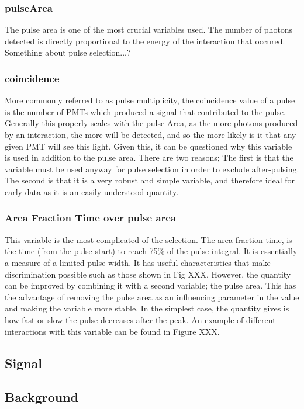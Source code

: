 \subsubsection{pulseArea}
The pulse area is one of the most crucial variables used.
The number of photons detected is directly proportional to the energy of the interaction that occured.
Something about pulse selection...?

\subsubsection{coincidence}
More commonly referred to as pulse multiplicity, the coincidence value of a pulse is the number of PMTs which produced a signal that contributed to the pulse.
Generally this properly scales with the pulse Area, as the more photons produced by an interaction, the more will be detected, and so the more likely is it that any given PMT will see this light.
Given this, it can be questioned why this variable is used in addition to the pulse area. 
There are two reasons;
The first is that the variable must be used anyway for pulse selection in order to exclude after-pulsing.
The second is that it is a very robust and simple variable, and therefore ideal for early data as it is an easily understood quantity.

\subsubsection{Area Fraction Time over pulse area}
This variable is the most complicated of the selection.
The area fraction time, is the time (from the pulse start) to reach 75\% of the pulse integral.
It is essentially a measure of a limited pulse-width.
It has useful characteristics that make discrimination possible such as those shown in Fig XXX.
However, the quantity can be improved by combining it with a second variable; the pulse area.
This has the advantage of removing the pulse area as an influencing parameter in the value and making the variable more stable.
In the simplest case, the quantity gives is how fast or slow the pulse decreases after the peak.
An example of different interactions with this variable can be found in Figure XXX.

\subsection{Signal}

\subsection{Background}
